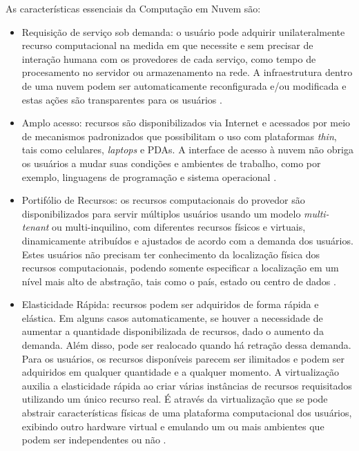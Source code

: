 As características essenciais da Computação em Nuvem são:

\begin{itemize}
  \item Requisição de serviço sob demanda: o usuário pode adquirir unilateralmente recurso computacional na medida em que necessite e sem precisar de interação humana com os provedores de cada serviço, como tempo de procesamento no servidor ou armazenamento na rede. A infraestrutura dentro de uma nuvem podem ser automaticamente reconfigurada e/ou modificada e estas ações são transparentes para os usuários \cite{ERCEMAPI2009}.
  
  \item Amplo acesso: recursos são disponibilizados via Internet e acessados por meio de mecanismos padronizados que possibilitam o uso com plataformas \textit{thin}, tais como celulares, \textit{laptops} e PDAs. A interface de acesso à nuvem não obriga os usuários a mudar suas condições e ambientes de trabalho, como por exemplo, linguagens de programação e sistema operacional \cite{ERCEMAPI2009}.
  
  \item Portifólio de Recursos: os recursos computacionais do provedor são disponibilizados para servir múltiplos usuários usando um modelo \textit{multi-tenant} ou multi-inquilino, com diferentes recursos físicos e virtuais, dinamicamente atribuídos e ajustados de acordo com a demanda dos usuários. Estes usuários não precisam ter conhecimento da localização física dos recursos computacionais, podendo somente especificar a localização em um nível mais alto de abstração, tais como o país, estado ou centro de dados \cite{ERCEMAPI2009}.
  
  \item Elasticidade Rápida: recursos podem ser adquiridos de forma rápida e elástica. Em alguns casos automaticamente, se houver a necessidade de aumentar a quantidade disponibilizada de recursos, dado o aumento da demanda. Além disso, pode ser realocado quando há retração dessa demanda. Para os usuários, os recursos disponíveis parecem ser ilimitados e podem ser adquiridos em qualquer quantidade e a qualquer momento. A virtualização auxilia a elasticidade rápida ao criar várias instâncias de recursos requisitados utilizando um único recurso real. É através da virtualização que se pode abstrair características físicas de uma plataforma computacional dos usuários, exibindo outro hardware virtual e emulando um ou mais ambientes que podem ser independentes ou não \cite{ERCEMAPI2009}.
  

\end{itemize}
